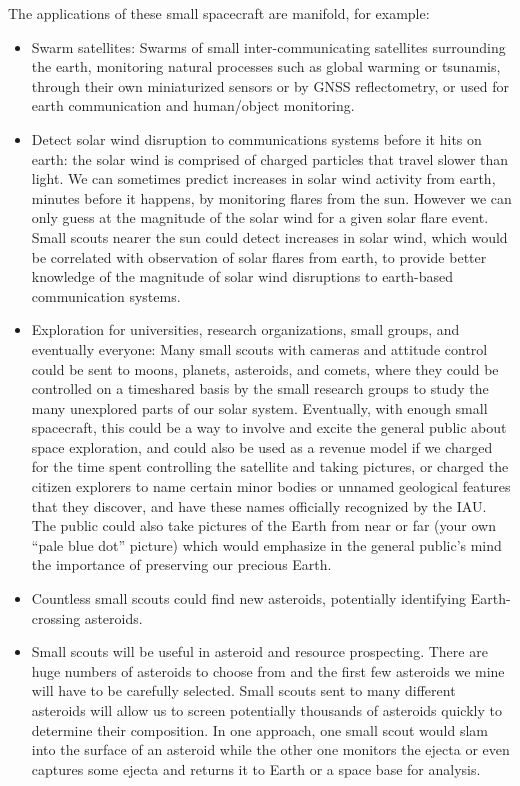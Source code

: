 \documentclass[letter,11pt]{article}
\begin{document}
The applications of these small spacecraft are manifold, for example:
\begin{itemize}
	\item Swarm satellites:  Swarms of small inter-communicating satellites
		surrounding the earth, monitoring natural processes such as global warming
		or tsunamis, through their own miniaturized sensors or by GNSS
		reflectometry, or used for earth communication and human/object monitoring.
	\item Detect solar wind disruption to communications systems before it hits
		on earth: the solar wind is comprised of charged particles that travel
		slower than light. We can sometimes predict increases in solar wind
		activity from earth, minutes before it happens, by monitoring flares from
		the sun. However we can only guess at the magnitude of the solar wind for a
		given solar flare event. Small scouts nearer the sun could detect increases
		in solar wind, which would be correlated with observation of solar flares
		from earth, to provide better knowledge of the magnitude of solar wind
		disruptions to earth-based communication systems.
	\item Exploration for universities, research organizations, small groups, and
		eventually everyone: Many small scouts with cameras and attitude control
		could be sent to moons, planets, asteroids, and comets, where they could be
		controlled on a timeshared basis by the small research groups to study the
		many unexplored parts of our solar system. Eventually, with enough small
		spacecraft, this could be a way to involve and excite the general public
		about space exploration, and could also be used as a revenue model if we
		charged for the time spent controlling the satellite and taking pictures,
		or charged the citizen explorers to name certain minor bodies or unnamed
		geological features that they discover, and have these names officially
		recognized by the IAU. The public could also take pictures of the Earth
		from near or far (your own ``pale blue dot'' picture) which would emphasize
		in the general public's mind the importance of preserving our precious
		Earth.
	\item Countless small scouts could find new asteroids, potentially
		identifying Earth-crossing asteroids.
	\item Small scouts will be useful in asteroid and resource prospecting. There
		are huge numbers of asteroids to choose from and the first few asteroids we
		mine will have to be carefully selected. Small scouts sent to many
		different asteroids will allow us to screen potentially thousands of
		asteroids quickly to determine their composition. In one approach, one
		small scout would slam into the surface of an asteroid while the other one
		monitors the ejecta or even captures some ejecta and returns it to Earth or
		a space base for analysis.
\end{itemize}
\end{document}
